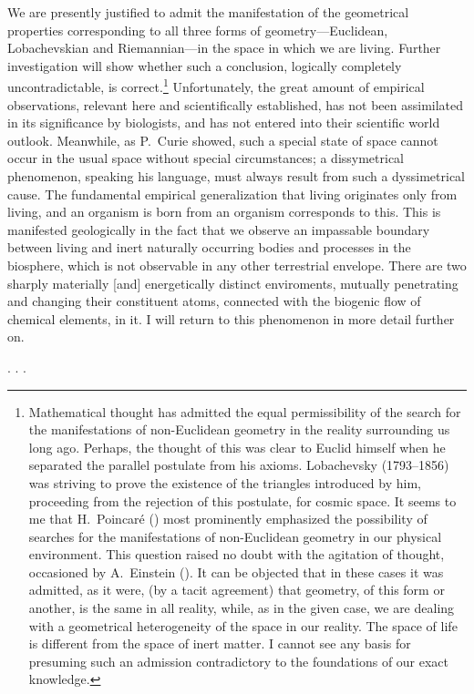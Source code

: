 We are presently justified to admit the manifestation of the geometrical
properties corresponding to all three forms of geometry---Euclidean,
Lobachevskian and Riemannian---in the space in which we are living.  Further
investigation will show whether such a conclusion, logically completely
uncontradictable, is correct.\footnote{
	Mathematical thought has admitted the equal permissibility of the
	search for the manifestations of non-Euclidean geometry in the reality
	surrounding us long ago.  Perhaps, the thought of this was clear to
	Euclid himself when he separated the parallel postulate from his
	axioms.  Lobachevsky (1793--1856) was striving to prove the existence
	of the triangles introduced by him, proceeding from the rejection of
	this postulate, for cosmic space.  It seems to me that H.~Poincaré
	(\cite[3, 66]{poincare1902science}) most prominently emphasized the
	possibility of searches for the manifestations of non-Euclidean
	geometry in our physical environment.  This question raised no doubt
	with the agitation of thought, occasioned by A.~Einstein
	(\cite{einstein1921geometrie}).  It can be objected that in these cases
	it was admitted, as it were,  (by a tacit
	agreement) that geometry, of this form or another, is the same in all
	reality, while, as in the given case, we are dealing with a geometrical
	heterogeneity of the space in our reality.  The space of life is
	different from the space of inert matter.  I cannot see any basis for
	presuming such an admission contradictory to the foundations of our
	exact knowledge.
}  Unfortunately, the great amount of empirical observations, relevant here and
scientifically established, has not been assimilated in its significance by
biologists, and has not entered into their scientific world outlook.
Meanwhile, as P.~Curie showed, such a special state of space cannot occur in
the usual space without special circumstances; a dissymetrical phenomenon,
speaking his language, must always result from such a dyssimetrical cause.  The
fundamental empirical generalization that living originates only from living,
and an organism is born from an organism corresponds to this.  This is
manifested geologically in the fact that we observe an impassable boundary
between living and inert naturally occurring bodies and processes in the
biosphere, which is not observable in any other terrestrial envelope.  There
are two sharply materially [and] energetically distinct enviroments, mutually
penetrating and changing their constituent atoms, connected with the biogenic
flow of chemical elements, in it.  I will return to this phenomenon in more
detail further on.


\Section %

. . .
